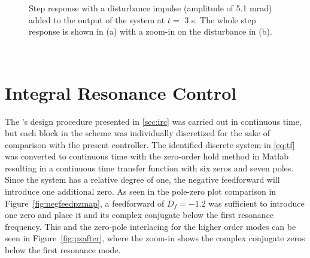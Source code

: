 \begin{figure}[h!]
  \centering %
  \qquad
  \caption{\label{fig:distmeasrejection} Step response with a disturbance impulse (amplitude of 5.1 mrad) added to the output of the system at $t=$ 3 s. The whole step response is shown in (a) with a zoom-in on the disturbance in (b).}
\end{figure}

\newpage~\newpage
\FloatBarrier
\section{Integral Resonance Control}
The \abbrIRC's design procedure presented in \ref{sec:irc} was carried out in continuous time, but each block in the scheme was individually discretized for the sake of comparison with the present controller. The identified discrete system in \eqref{eq:tf} was converted to continuous time with the zero-order hold method in Matlab resulting in a continuous time transfer function with six zeros and seven poles. Since the system has a relative degree of one, the negative feedforward will introduce one additional zero. As seen in the pole-zero plot comparison in Figure~\ref{fig:negfeedpzmap}, a feedforward of $D_f=-1.2$ was sufficient to introduce one zero and place it and its complex conjugate below the first resonance frequency. This and the zero-pole interlacing for the higher order modes can be seen in Figure~\ref{fig:pzafter}, where the zoom-in shows the complex conjugate zeros below the first resonance mode.

